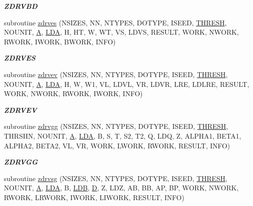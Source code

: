 \begin{DoxyCompactItemize}
\begin{DoxyCompactList}\small\item\em {\bfseries Z\+D\+R\+V\+B\+D} \end{DoxyCompactList}\item 
subroutine \hyperlink{group__complex16__eig_ga46e5b4f2d2d900a8be48339a8fcbff42}{zdrves} (N\+S\+I\+Z\+E\+S, N\+N, N\+T\+Y\+P\+E\+S, D\+O\+T\+Y\+P\+E, I\+S\+E\+E\+D, \hyperlink{zlaqgs_8c_a0656018abfc9fa2821827415f5d5ea57}{T\+H\+R\+E\+S\+H}, N\+O\+U\+N\+I\+T, \hyperlink{classA}{A}, \hyperlink{example__user_8c_ae946da542ce0db94dced19b2ecefd1aa}{L\+D\+A}, H, H\+T, W, W\+T, V\+S, L\+D\+V\+S, R\+E\+S\+U\+L\+T, W\+O\+R\+K, N\+W\+O\+R\+K, R\+W\+O\+R\+K, I\+W\+O\+R\+K, B\+W\+O\+R\+K, I\+N\+F\+O)
\begin{DoxyCompactList}\small\item\em {\bfseries Z\+D\+R\+V\+E\+S} \end{DoxyCompactList}\item 
subroutine \hyperlink{group__complex16__eig_ga09d05af8ce92a19304b6700e26d1548e}{zdrvev} (N\+S\+I\+Z\+E\+S, N\+N, N\+T\+Y\+P\+E\+S, D\+O\+T\+Y\+P\+E, I\+S\+E\+E\+D, \hyperlink{zlaqgs_8c_a0656018abfc9fa2821827415f5d5ea57}{T\+H\+R\+E\+S\+H}, N\+O\+U\+N\+I\+T, \hyperlink{classA}{A}, \hyperlink{example__user_8c_ae946da542ce0db94dced19b2ecefd1aa}{L\+D\+A}, H, W, W1, V\+L, L\+D\+V\+L, V\+R, L\+D\+V\+R, L\+R\+E, L\+D\+L\+R\+E, R\+E\+S\+U\+L\+T, W\+O\+R\+K, N\+W\+O\+R\+K, R\+W\+O\+R\+K, I\+W\+O\+R\+K, I\+N\+F\+O)
\begin{DoxyCompactList}\small\item\em {\bfseries Z\+D\+R\+V\+E\+V} \end{DoxyCompactList}\item 
subroutine \hyperlink{group__complex16__eig_ga8f328a5e733c25b59a64e5aceec5bf7f}{zdrvgg} (N\+S\+I\+Z\+E\+S, N\+N, N\+T\+Y\+P\+E\+S, D\+O\+T\+Y\+P\+E, I\+S\+E\+E\+D, \hyperlink{zlaqgs_8c_a0656018abfc9fa2821827415f5d5ea57}{T\+H\+R\+E\+S\+H}, T\+H\+R\+S\+H\+N, N\+O\+U\+N\+I\+T, \hyperlink{classA}{A}, \hyperlink{example__user_8c_ae946da542ce0db94dced19b2ecefd1aa}{L\+D\+A}, B, S, T, S2, T2, Q, L\+D\+Q, Z, A\+L\+P\+H\+A1, B\+E\+T\+A1, A\+L\+P\+H\+A2, B\+E\+T\+A2, V\+L, V\+R, W\+O\+R\+K, L\+W\+O\+R\+K, R\+W\+O\+R\+K, R\+E\+S\+U\+L\+T, I\+N\+F\+O)
\begin{DoxyCompactList}\small\item\em {\bfseries Z\+D\+R\+V\+G\+G} \end{DoxyCompactList}\item 
subroutine \hyperlink{group__complex16__eig_gadac8ad25581dfea4f0a2b147a7ce7da9}{zdrvsg} (N\+S\+I\+Z\+E\+S, N\+N, N\+T\+Y\+P\+E\+S, D\+O\+T\+Y\+P\+E, I\+S\+E\+E\+D, \hyperlink{zlaqgs_8c_a0656018abfc9fa2821827415f5d5ea57}{T\+H\+R\+E\+S\+H}, N\+O\+U\+N\+I\+T, \hyperlink{classA}{A}, \hyperlink{example__user_8c_ae946da542ce0db94dced19b2ecefd1aa}{L\+D\+A}, B, \hyperlink{example__user_8c_a50e90a7104df172b5a89a06c47fcca04}{L\+D\+B}, \hyperlink{odrpack_8h_a7dae6ea403d00f3687f24a874e67d139}{D}, Z, L\+D\+Z, A\+B, B\+B, A\+P, B\+P, W\+O\+R\+K, N\+W\+O\+R\+K, R\+W\+O\+R\+K, L\+R\+W\+O\+R\+K, I\+W\+O\+R\+K, L\+I\+W\+O\+R\+K, R\+E\+S\+U\+L\+T, I\+N\+F\+O)

\end{DoxyCompactItemize}
